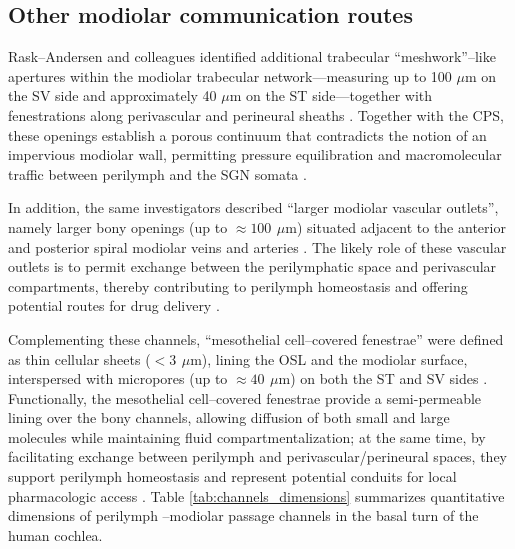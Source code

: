 \documentclass[referee,pdflatex, sn-vancouver-num]{sn-jnl}%
\theoremstyle{thmstyleone}%
\theoremstyle{thmstyletwo}%
\theoremstyle{thmstylethree}%
\newcommand{\um}{\ensuremath{\,\mu\mathrm{m}}}
\DeclareRobustCommand{\textendash}{\ifmmode\text{-}\else\leavevmode\hbox{--}\fi}
\begin{document}
\subsection{Other modiolar communication routes}
Rask\textendash Andersen and colleagues identified additional trabecular “meshwork”–like apertures within the modiolar trabecular network—measuring up to 100 $\mu \mathrm{m}$ on the SV side and approximately 40 $\mu\mathrm{m}$ on the ST side—together with fenestrations along perivascular and perineural sheaths \cite{raskandersen2006}. Together with the CPS, these openings establish a porous continuum that contradicts the notion of an impervious modiolar wall, permitting pressure equilibration and macromolecular traffic between perilymph and the SGN somata \cite{raskandersen2006, shepherd2004}.

In addition, the same investigators described “larger modiolar vascular outlets”, namely larger bony openings (up to $\approx \SI{100}{\um}$) situated adjacent to the anterior and posterior spiral modiolar veins and arteries \cite{raskandersen2006, shepherd2004}. The likely role of these vascular outlets is to permit exchange between the perilymphatic space and perivascular compartments, thereby contributing to perilymph homeostasis and offering potential routes for drug delivery \cite{raskandersen2006, shepherd2004}.

Complementing these channels, “mesothelial cell–covered fenestrae” were defined as thin cellular sheets ($< \SI{3}{\um}$), lining the OSL and the modiolar surface, interspersed with micropores (up to $\approx \SI{40}{\um}$) on both the ST and SV sides \cite{raskandersen2006, shepherd2004}. Functionally, the mesothelial cell–covered fenestrae provide a semi-permeable lining over the bony channels, allowing diffusion of both small and large molecules while maintaining fluid compartmentalization; at the same time, by facilitating exchange between perilymph and perivascular/perineural spaces, they support perilymph homeostasis and represent potential conduits for local pharmacologic access \cite{raskandersen2006, shepherd2004}. Table \ref{tab:channels_dimensions} summarizes quantitative dimensions of perilymph \textendash modiolar passage channels in the basal turn of the human cochlea. 
\end{document}
